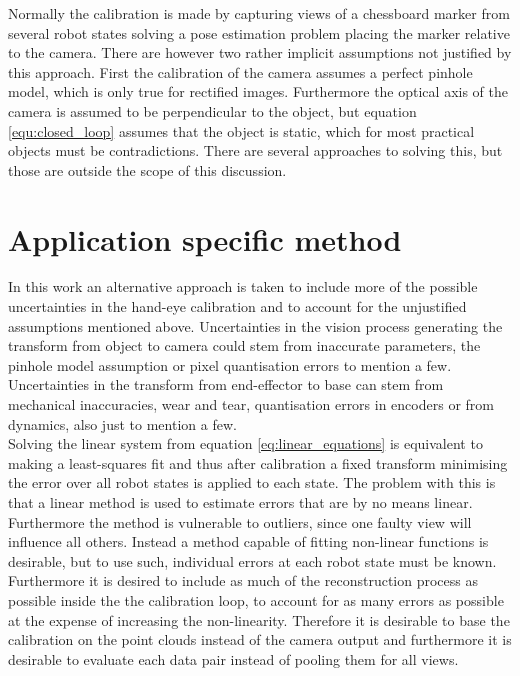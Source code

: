 \noindent Normally the calibration is made by capturing views of a chessboard marker from several robot states solving a pose estimation problem placing the marker relative to the camera. There are however two rather implicit assumptions \cite{Horaud1995} not justified by this approach. First the calibration of the camera assumes a perfect pinhole model, which is only true for rectified images. Furthermore the optical axis of the camera is assumed to be perpendicular to the object, but equation \ref{equ:closed_loop} assumes that the object is static, which for most practical objects must be contradictions. There are several approaches to solving this, but those are outside the scope of this discussion. 

\section{Application specific method}
In this work an alternative approach is taken to include more of the possible uncertainties in the hand-eye calibration and to account for the unjustified assumptions mentioned above. Uncertainties in the vision process generating the transform from object to camera could stem from inaccurate parameters, the pinhole model assumption or pixel quantisation errors to mention a few. Uncertainties in the transform from end-effector to base can stem from mechanical inaccuracies, wear and tear, quantisation errors in encoders or from dynamics, also just to mention a few. \\

\noindent Solving the linear system from equation \ref{eq:linear_equations} is equivalent to making a least-squares fit and thus after calibration a fixed transform minimising the error over all robot states is applied to each state. The problem with this is that a linear method is used to estimate errors that are by no means linear. Furthermore the method is vulnerable to outliers, since one faulty view will influence all others. Instead a method capable of fitting non-linear functions is desirable, but to use such, individual errors at each robot state must be known. Furthermore it is desired to include as much of the reconstruction process as possible inside the the calibration loop, to account for as many errors as possible at the expense of increasing the non-linearity. Therefore it is desirable to base the calibration on the point clouds instead of the camera output and furthermore it is desirable to evaluate each data pair instead of pooling them for all views.\\

